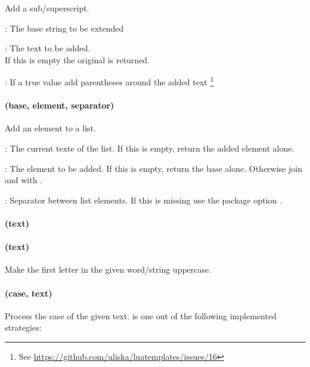 \documentclass{scrartcl}
\begin{document}
Add a sub/superscript.

\begin{itemize*}
\item {}: The base string to be extended
\item {}: The text to be added.\\If this is empty the original
 is returned.
\item {}: If a true value add parentheses around the added text%
\footnote{See \url{https://github.com/uliska/luatemplates/issues/16}}
\end{itemize*}


\paragraph{ (base, element, separator)}

Add an element to a list.

\begin{itemize*}
\item {}: The current texte of the list. If this is empty, return
the added element alone.
\item {}: The element to be added. If this is empty, return the base
alone.  Otherwise join  and  with .
\item {}: Separator between list elements.  If this is missing
use the package option .
\end{itemize*}


\paragraph{ (text)}

\paragraph{ (text)}

Make the first letter in the given word/string uppercase.


\paragraph{ (case, text)}

Process the case of the given text.   is one out of the following
implemented strategies:
\end{document}
